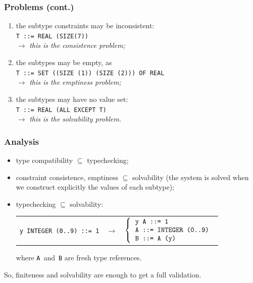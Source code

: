 \documentclass[compress,dvips,xcolor={dvipsnames},t]{beamer}
\newcounter{savedenum}
\newcommand*{\resume}{\setcounter{enumi}{\thesavedenum}}
\begin{document}
\begin{frame}
\frametitle{Problems (cont.)}

\begin{enumerate}

\resume

  \item \label{constraint_consistence} the subtype constraints may
        be inconsistent:\\
        \texttt{T ::= REAL (SIZE(7))}\\
        \(\rightarrow\) \emph{this is the consistence problem;}

  \item \label{subtype_non_emptyness} the subtypes may be empty, as\\
        \texttt{T ::= SET ((SIZE (1))  (SIZE (2))) OF REAL}\\
        \(\rightarrow\) \emph{this is the emptiness problem;}

  \item \label{solvability} the subtypes may have no value set:\\
        \texttt{T ::= REAL (ALL EXCEPT T)}\\
        \(\rightarrow\) \emph{this is the solvability problem.}

\end{enumerate}

\end{frame}

\begin{frame}
\frametitle{Analysis}

\begin{itemize}

  \item type compatibility $\subseteq$ typechecking;

  \item constraint consistence, emptiness $\subseteq$ solvability
        (the system is solved when we construct explicitly the values
        of each subtype);

  \item typechecking $\subseteq$ solvability:
\begin{tabular}{@{}r@{\;}c@{\;}l@{}}
   \texttt{y INTEGER (0..9) ::= 1}
   & $\rightarrow$
   & $\left\{
       \begin{tabular}{l}
           \texttt{y A ::= 1} \\
           \texttt{A ::= INTEGER (0..9)} \\
           \texttt{B ::= A (y)}
        \end{tabular}
     \right.$
\end{tabular}
where \texttt{A}~and~\texttt{B} are fresh type references.

\end{itemize}

So, finiteness and solvability are enough to get a full validation.

\end{frame}
\end{document}

